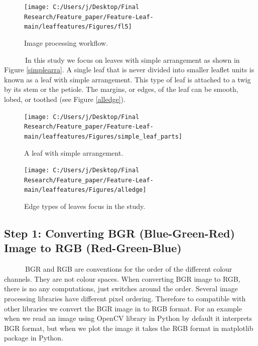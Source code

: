 \documentclass{article}
\begin{document}
\begin{figure}[!ht]

{\centering \texttt{[image: C:/Users/j/Desktop/Final Research/Feature\_paper/Feature-Leaf-main/leaffeatures/Figures/fl5]} 

}

\caption{\label{figtest2}Image processing workflow.}\label{fig:unnamed-chunk-2}
\end{figure}

~~~~~~In this study we focus on leaves with simple arrangement as shown
in Figure \ref{simplearra}. A single leaf that is never divided into
smaller leaflet units is known as a leaf with simple arrangement. This
type of leaf is attached to a twig by its stem or the petiole. The
margins, or edges, of the leaf can be smooth, lobed, or toothed (see
Figure \ref{alledge}).

\begin{figure}[!ht]

{\centering \texttt{[image: C:/Users/j/Desktop/Final Research/Feature\_paper/Feature-Leaf-main/leaffeatures/Figures/simple\_leaf\_parts]} 

}

\caption{\label{simplearra} A leaf with simple arrangement.}\label{fig:unnamed-chunk-3}
\end{figure}

\begin{figure}[!ht]

{\centering \texttt{[image: C:/Users/j/Desktop/Final Research/Feature\_paper/Feature-Leaf-main/leaffeatures/Figures/alledge]} 

}

\caption{\label{alledge} Edge types of leaves focus in the study.}\label{fig:unnamed-chunk-4}
\end{figure}

\hypertarget{step-1-converting-bgr-blue-green-red-image-to-rgb-red-green-blue}{%
\subsection{Step 1: Converting BGR (Blue-Green-Red) Image to RGB
(Red-Green-Blue)}\label{step-1-converting-bgr-blue-green-red-image-to-rgb-red-green-blue}}

~~~~~~BGR and RGB are conventions for the order of the different colour
channels. They are not colour spaces. When converting BGR image to RGB,
there is no any computations, just switches around the order. Several
image processing libraries have different pixel ordering. Therefore to
compatible with other libraries we convert the BGR image in to RGB
format. For an example when we read an image using OpenCV library in
Python by default it interprets BGR format, but when we plot the image
it takes the RGB format in matplotlib package in Python.
\end{document}
